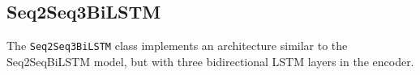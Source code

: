 \subsection{Seq2Seq3BiLSTM}
The \texttt{Seq2Seq3BiLSTM} class implements an architecture similar to the Seq2SeqBiLSTM model, but with three bidirectional LSTM layers in the encoder.

